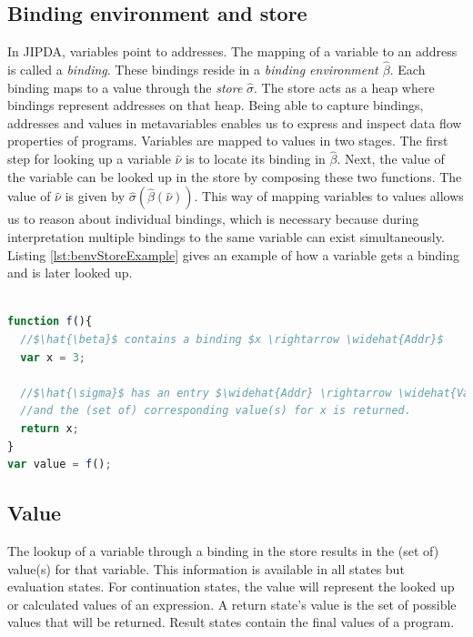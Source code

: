 \subsection*{Binding environment and store}

In JIPDA, variables point to addresses. The mapping of a variable to an address is called a \textit{binding}. These bindings reside in a \textit{binding environment $\hat{\beta}$}. Each binding maps to a value through the \textit{store} $\hat{\sigma}$. The store acts as a heap where bindings represent addresses on that heap. Being able to capture bindings, addresses and values in metavariables enables us to express and inspect data flow properties of programs. Variables are mapped to values in two stages. The first step for looking up a variable $\hat{\nu}$ is to locate its binding in $\hat{\beta}$. Next, the value of the variable can be looked up in the store by composing these two functions. The value of $\hat{\nu}$ is given by $\hat{\sigma}(\hat{\beta}(\hat{\nu}))$. This way of mapping variables to values allows us to reason about individual bindings, which is necessary because during interpretation multiple bindings to the same variable can exist simultaneously. Listing \ref{lst:benvStoreExample} gives an example of how a variable gets a binding and is later looked up.
\\
\begin{lstlisting}[label={lst:benvStoreExample},language=JavaScript,caption=Example of the binding environment and store workings, mathescape=true]  % float=t?

function f(){
  //$\hat{\beta}$ contains a binding $x \rightarrow \widehat{Addr}$
  var x = 3; 
  
  //$\hat{\sigma}$ has an entry $\widehat{Addr} \rightarrow \widehat{Val}$
  //and the (set of) corresponding value(s) for x is returned. 
  return x;
}
var value = f();
\end{lstlisting}


\subsection*{Value}
The lookup of a variable through a binding in the store results in the (set of) value(s) for that variable. This information is available in all states but evaluation states. For continuation states, the value will represent the looked up or calculated values of an expression. A return state's value is the set of possible values that will be returned. Result states contain the final values of a program.

